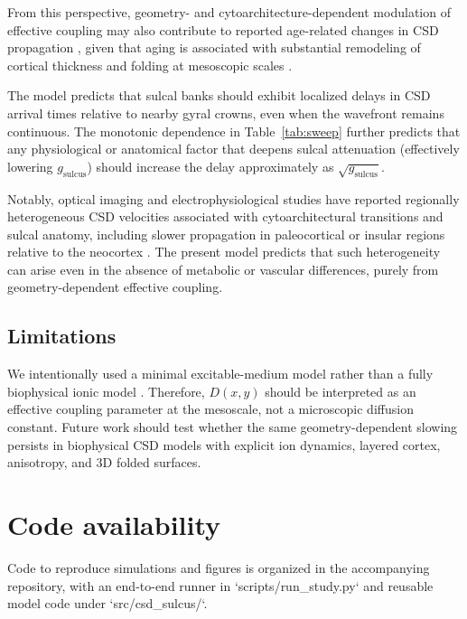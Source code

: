 \documentclass[12pt]{article}
\begin{document}
From this perspective, geometry- and cytoarchitecture-dependent modulation of effective coupling may also contribute to reported age-related changes in CSD propagation \citep{Guedes2019}, given that aging is associated with substantial remodeling of cortical thickness and folding at mesoscopic scales \citep{Lockhart2014structural}.

The model predicts that sulcal banks should exhibit localized delays in CSD arrival times relative to nearby gyral crowns, even when the wavefront remains continuous. The monotonic dependence in Table~\ref{tab:sweep} further predicts that any physiological or anatomical factor that deepens sulcal attenuation (effectively lowering $g_{\mathrm{sulcus}}$) should increase the delay approximately as $\sqrt{g_{\mathrm{sulcus}}}$.

Notably, optical imaging and electrophysiological studies have reported regionally heterogeneous CSD velocities associated with cytoarchitectural transitions and sulcal anatomy, including slower propagation in paleocortical or insular regions relative to the neocortex \citep{Vilagi2001,Fujita2016}. The present model predicts that such heterogeneity can arise even in the absence of metabolic or vascular differences, purely from geometry-dependent effective coupling.

\subsection{Limitations}

We intentionally used a minimal excitable-medium model rather than a fully biophysical ionic model \citep{Wei2014,Zandt2015}. Therefore, $D(x,y)$ should be interpreted as an effective coupling parameter at the mesoscale, not a microscopic diffusion constant. Future work should test whether the same geometry-dependent slowing persists in biophysical CSD models with explicit ion dynamics, layered cortex, anisotropy, and 3D folded surfaces.

\section*{Code availability}
Code to reproduce simulations and figures is organized in the accompanying repository, with an end-to-end runner in `scripts/run_study.py` and reusable model code under `src/csd_sulcus/`.



\end{document}
